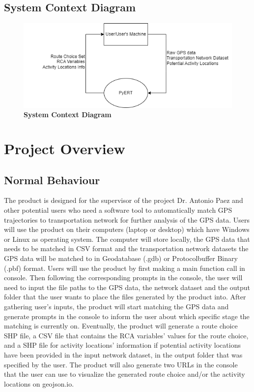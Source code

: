 \documentclass[12pt, titlepage]{article}
\begin{document}
\subsection{System Context Diagram}
\begin{figure}[!htbp]
    \centering
    \includegraphics[scale=0.60]{System_Context.png}
    \caption{\bf System Context Diagram}
\end{figure}
\newpage

\section{Project Overview}

\subsection{Normal Behaviour}
The product is designed for the supervisor of the project Dr. Antonio Paez and other potential users who need a software tool to automatically match GPS trajectories to transportation network for further analysis of the GPS data. Users will use the product on their computers (laptop or desktop) which have Windows or Linux as operating system. The computer will store locally, the GPS data that needs to be matched in CSV format and the transportation network datasets the GPS data will be matched to in Geodatabase (.gdb) or Protocolbuffer Binary (.pbf) format. Users will use the product by first making a main function call in console. Then following the corresponding prompts in the console, the user will need to input the file paths to the GPS data, the network dataset and the output folder that the user wants to place the files generated by the product into. After gathering user's inputs, the product will start matching the GPS data and generate prompts in the console to inform the user about which specific stage the matching is currently on. Eventually, the product will generate a route choice SHP file, a CSV file that contains the RCA variables' values for the route choice, and a SHP file for activity locations' information if potential activity locations have been provided in the input network dataset, in the output folder that was specified by the user. The product will also generate two URLs in the console that the user can use to visualize the generated route choice and/or the activity locations on geojson.io.
\end{document}
